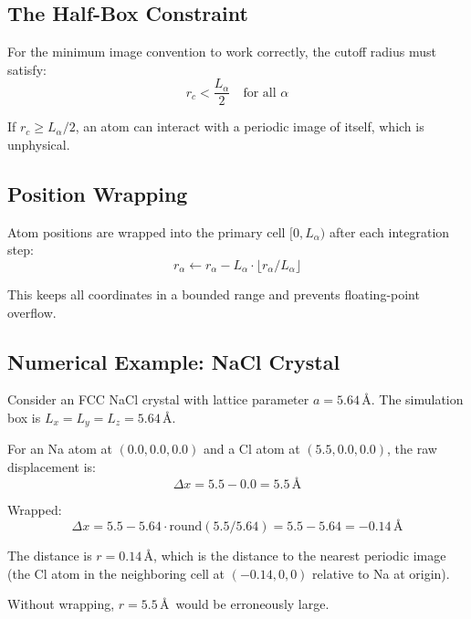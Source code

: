\documentclass[11pt]{article}
\begin{document}
\subsection{The Half-Box Constraint}

For the minimum image convention to work correctly, the cutoff radius must satisfy:
\begin{equation}
r_c < \frac{L_\alpha}{2} \quad \text{for all } \alpha
\end{equation}

If $r_c \geq L_\alpha/2$, an atom can interact with a periodic image of itself, which is unphysical.

\subsection{Position Wrapping}

Atom positions are wrapped into the primary cell $[0, L_\alpha)$ after each integration step:
\begin{equation}
r_\alpha \gets r_\alpha - L_\alpha \cdot \lfloor r_\alpha / L_\alpha \rfloor
\end{equation}

This keeps all coordinates in a bounded range and prevents floating-point overflow.

\subsection{Numerical Example: NaCl Crystal}

Consider an FCC NaCl crystal with lattice parameter $a = 5.64$\,\AA. The simulation box is $L_x = L_y = L_z = 5.64$\,\AA.

For an Na atom at $(0.0, 0.0, 0.0)$ and a Cl atom at $(5.5, 0.0, 0.0)$, the raw displacement is:
\begin{equation}
\Delta x = 5.5 - 0.0 = 5.5\,\text{\AA}
\end{equation}

Wrapped:
\begin{equation}
\Delta x = 5.5 - 5.64 \cdot \text{round}(5.5/5.64) = 5.5 - 5.64 = -0.14\,\text{\AA}
\end{equation}

The distance is $r = 0.14$\,\AA, which is the distance to the nearest periodic image (the Cl atom in the neighboring cell at $(-0.14, 0, 0)$ relative to Na at origin).

Without wrapping, $r = 5.5$\,\AA\ would be erroneously large.
\end{document}
